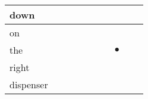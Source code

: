 \documentclass[landscape]{article}
\newcommand{\ssp}{\hspace{2pt}}
\newcommand{\mex}{\cellcolor{g}$\bullet$}
\begin{document}
\begin{tabular}{|l|p{10pt}|p{10pt}|p{10pt}|p{10pt}|p{10pt}|p{10pt}|p{10pt}|p{10pt}|p{10pt}|}
\hline
\ssp down \ssp&\hspace{2pt}&\hspace{2pt}&\hspace{2pt}&\hspace{2pt}&\hspace{2pt}&\hspace{2pt}&\hspace{2pt}&\hspace{2pt}&\hspace{2pt}\\
\hline
\ssp on \ssp&\hspace{2pt}&\hspace{2pt}&\hspace{2pt}&\hspace{2pt}&\hspace{2pt}&\hspace{2pt}&\hspace{2pt}&\hspace{2pt}&\hspace{2pt}\\
\hline
\ssp \cellcolor{ref6}the \ssp&\hspace{2pt}&\hspace{2pt}&\hspace{2pt}&\hspace{2pt}&\hspace{2pt}&\hspace{2pt}&\hspace{2pt}\mex&\hspace{2pt}&\hspace{2pt}\\
\hline
\ssp right \ssp&\hspace{2pt}&\hspace{2pt}&\hspace{2pt}&\hspace{2pt}&\hspace{2pt}&\hspace{2pt}&\hspace{2pt}&\hspace{2pt}&\hspace{2pt}\\
\hline
\ssp dispenser \ssp&\hspace{2pt}&\hspace{2pt}&\hspace{2pt}&\hspace{2pt}&\hspace{2pt}&\hspace{2pt}&\hspace{2pt}&\hspace{2pt}&\hspace{2pt}\\

\end{tabular}
\end{document}
